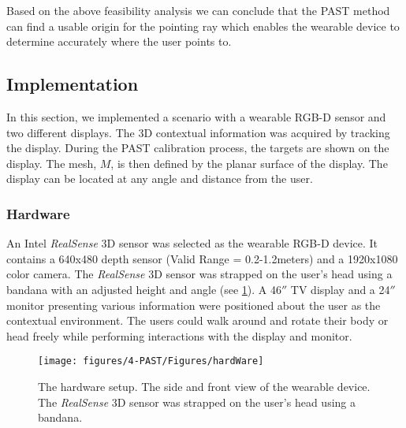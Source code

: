 Based on the above feasibility analysis we can conclude that the PAST method can find a usable origin for the pointing ray which enables the wearable device to determine accurately where the user points to.
\subsection{Implementation}
In this section, we implemented a scenario with a wearable RGB-D sensor and two different displays. The 3D contextual information was acquired by tracking the display. During the PAST calibration process, the targets are shown on the display. The mesh, $M$, is then defined by the planar surface of the display. The display can be located at any angle and distance from the user.

\subsubsection{Hardware}
An Intel \textit{RealSense} 3D sensor  was selected as the wearable RGB-D device. It contains a 640x480 depth sensor (Valid Range = 0.2-1.2meters) and a 1920x1080 color camera. 
The \textit{RealSense} 3D sensor was strapped on the user{\rq}s head using a bandana with an adjusted height and angle (see \figurename{ \ref{fig:hardWare}}). 
A 46$''$ TV display and a 24$''$ monitor presenting various information were positioned about the user as the contextual environment. 
The users could walk around and rotate their body or head freely while performing interactions with the display and monitor. 

\begin{figure}
	\centering
	\texttt{[image: figures/4-PAST/Figures/hardWare]}
	\caption{The hardware setup. The side and front view of the wearable device. The \textit{RealSense} 3D sensor was strapped on the user{\rq}s head using a bandana.}
	\label{fig:hardWare}
\end{figure}
